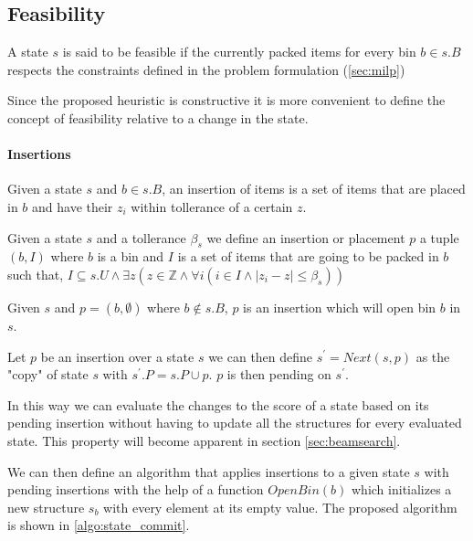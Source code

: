 \subsection{Feasibility}
\label{sec:problem_state:feasibility}%
A state $s$ is said to be feasible if the currently packed items for every bin $b \in s.B$ respects the constraints defined in the problem formulation (\ref{sec:milp})

Since the proposed heuristic is constructive it is more convenient to define the concept of feasibility relative to a change in the state.

\paragraph*{Insertions}

Given a state $s$ and $b \in s.B$, an insertion of items is a set of items that are placed in $b$ and have their $z_i$ within tollerance of a certain $z$.

\begin{definition}[Insertion]
    \label{def:insertion}%
    Given a state $s$ and a tollerance $\beta_s$ we define an insertion or placement $p$ a tuple $(b, I)$ where $b$ is a bin and $I$ is a set of items that are going to be packed in $b$ such that, $I \subseteq s.U \land \exists z (z \in \mathbb{Z} \land \forall i ( i \in I \land |z_i - z| \le \beta_s))$
\end{definition}

\begin{observation}
    Given $s$ and $p = (b, \emptyset)$ where $b \notin s.B$, $p$ is an insertion which will open bin $b$ in $s$.
\end{observation}

\begin{definition}[Next]
    \label{def:state_next}%
    Let $p$ be an insertion over a state $s$ we can then define $s^\prime = Next(s, p)$ as the "copy" of state $s$ with $s^\prime.P = s.P \cup p$. $p$ is then pending on $s^\prime$.
\end{definition}

In this way we can evaluate the changes to the score of a state based on its pending insertion without having to update all the structures for every evaluated state. This property will become apparent in section \ref{sec:beamsearch}. 

We can then define an algorithm that applies insertions to a given state $s$ with pending insertions with the help of a function $OpenBin(b)$ which initializes a new structure $s_b$ with every element at its empty value.
The proposed algorithm is shown in \ref{algo:state_commit}.

